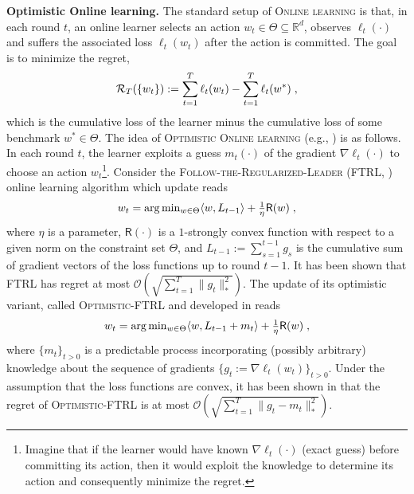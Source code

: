 \documentclass[twoside]{article}
\begin{document}
\textbf{Optimistic Online learning.}\hspace{0.1cm}
The standard setup of \textsc{Online learning} is that, in each round $t$, an online learner selects an action $w_{t} \in \Theta \subseteq \mathbb R^{d}$, observes $\ell_{t}(\cdot)$ and suffers the associated loss $\ell_{t}(w_t)$ after the action is committed.
The goal is to minimize the regret, 
$$\mathcal{R}_{T}( \{ w_t \} ):= \sum_{t=1}^T \ell_{t}(w_t) - \sum_{t=1}^T \ell_{t}(w^*)\;,$$
which is the cumulative loss of the learner minus the cumulative loss of some benchmark $w^{*} \in \Theta$.
The idea of \textsc{Optimistic Online learning} (e.g., \citep{CJ12,RS13b,SALS15,ALLW18}) is as follows.
In each round $t$, the learner exploits a guess $m_t(\cdot)$ of the gradient $\nabla \ell_t(\cdot)$ to choose an action $w_t$\footnote{Imagine that if the learner would have known $\nabla \ell_t(\cdot)$ (\ie exact guess) before committing its action, then it would exploit the knowledge to determine its action and consequently minimize the regret.}. 
Consider the \textsc{Follow-the-Regularized-Leader} (\textsc{FTRL}, \citep{H14}) online learning algorithm which update reads
\begin{equation} \notag
\textstyle w_t  = \arg \min_{w \in \Theta} \langle w , L_{t-1} \rangle + \frac{1}{\eta} \textsf{R}(w) \;,
\end{equation}
where $\eta$ is a parameter, $\textsf{R}(\cdot)$ is a $1$-strongly convex function with respect to a given norm on the constraint set $\Theta$, and $L_{t-1}:= \sum_{s=1}^{t-1} g_s$ is the cumulative sum of gradient vectors of the loss functions up to round $t-1$. It has been shown that FTRL has regret at most $\mathcal{O}(\sqrt{\sum_{t=1}^T \| g_t \|_*^2})$.
The update of its optimistic variant, called \textsc{Optimistic-FTRL} and developed in \citep{SALS15} reads
\begin{equation} \label{optFTRL}
\textstyle w_t  = \arg \min_{w \in \Theta} \langle w , L_{t-1} + m_t \rangle + \frac{1}{\eta} \textsf{R}(w)\;,
\end{equation}
where $\{m_{t}\}_{t>0}$ is a predictable process incorporating (possibly arbitrary) knowledge about the sequence of gradients $\{ g_{t}:=\nabla \ell_t(w_t)\}_{t>0}$.
Under the assumption that the loss functions are convex, it has been shown in \citep{SALS15} that the regret of \textsc{Optimistic-FTRL} is at most $\mathcal{O}(\sqrt{\sum_{t=1}^T \| g_t - m_t \|_*^2 } )$.
\end{document}
